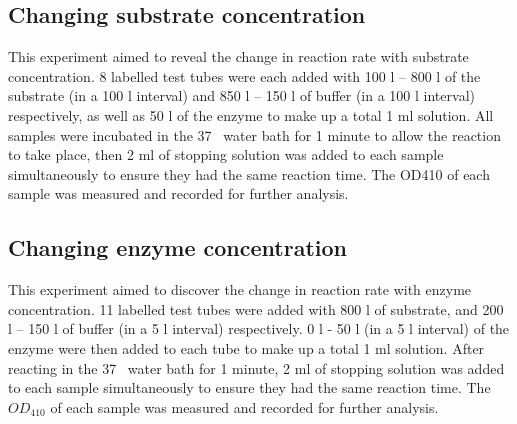 \documentclass[a4paper,10pt]{article}
\begin{document}
\begin{multicols}{2}
\subsection{Changing substrate concentration}
This experiment aimed to reveal the change in reaction rate with substrate concentration. 8 labelled test tubes were each added with 100 \textmu l – 800 \textmu l of the substrate (in a 100 \textmu l interval) and 850 \textmu l – 150 \textmu l of buffer (in a 100 \textmu l interval) respectively, as well as 50 \textmu l of the enzyme to make up a total 1 ml solution. All samples were incubated in the 37 \textcelsius\ water bath for 1 minute to allow the reaction to take place, then 2 ml of stopping solution was added to each sample simultaneously to ensure they had the same reaction time. The OD410 of each sample was measured and recorded for further analysis.


\subsection{Changing enzyme concentration}

This experiment aimed to discover the change in reaction rate with enzyme concentration. 11 labelled test tubes were added with 800 \textmu l of substrate, and 200 \textmu l – 150 \textmu l of buffer (in a 5 \textmu l interval) respectively. 0 \textmu l - 50 \textmu l (in a 5 \textmu l interval) of the enzyme were then added to each tube to make up a total 1 ml solution. After reacting in the 37 \textcelsius\ water bath for 1 minute, 2 ml of stopping solution was added to each sample simultaneously to ensure they had the same reaction time. The $OD_{410}$ of each sample was measured and recorded for further analysis.



\end{multicols}
\end{document}
